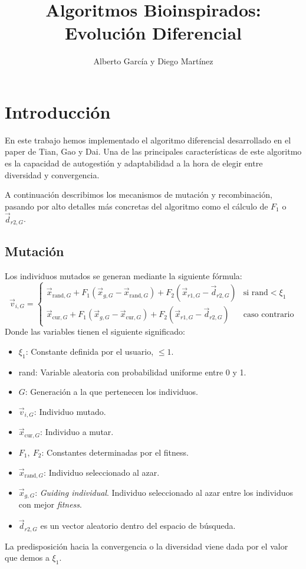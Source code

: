 \documentclass{article}
\title{Algoritmos Bioinspirados: Evolución Diferencial}
\author{Alberto García y Diego Martínez}
\begin{document}
\maketitle
\section{Introducción}
En este trabajo hemos implementado el algoritmo diferencial desarrollado en el paper de Tian, Gao y Dai\cite{mainPaper}. Una de las principales características de este algoritmo es la capacidad de autogestión y adaptabilidad a la hora de elegir entre diversidad y convergencia.

A continuación describimos los mecanismos de mutación y recombinación, pasando por alto detalles más concretas del algoritmo como el cálculo de $F_1$ o $\vec{d}_{r2, G}$.
\subsection{Mutación}
Los individuos mutados se generan mediante la siguiente fórmula:
\begin{equation}
    \vec{v}_{i,G} = \left\{\begin{array}{ll}
            \vec{x}_{\text{rand},G} + F_1(\vec{x}_{g,G}-\vec{x}_{\text{rand}, G})+ F_2(\vec{x}_{r1,G}-\vec{d}_{r2, G})&\text{si rand}<\xi_1\\
            \vec{x}_{\text{cur},G} + F_1(\vec{x}_{g,G}-\vec{x}_{\text{cur}, G})+ F_2(\vec{x}_{r1,G}-\vec{d}_{r2, G})&\text{caso contrario}
    \end{array}\right.
\label{ec_mutacion}
\end{equation}
Donde las variables tienen el siguiente significado:
\begin{itemize}
    \item $\xi_1$: Constante definida por el usuario, $\le1$.
    \item rand: Variable aleatoria con probabilidad uniforme entre 0 y 1.
    \item $G$: Generación a la que pertenecen los individuos.
    \item $\vec{v}_{i,G}$: Individuo mutado.
    \item $\vec{x}_{\text{cur},G}$: Individuo a mutar.
    \item $F_1,\ F_2$: Constantes determinadas por el fitness.
    \item $\vec{x}_{\text{rand},G}$: Individuo seleccionado al azar.
    \item $\vec{x}_{g,G}$: \textit{Guiding individual}. Individuo seleccionado al azar entre los individuos con mejor \textit{fitness}.
    \item $\vec{d}_{r2,G}$ es un vector aleatorio dentro del espacio de búsqueda.
\end{itemize}
La predisposición hacia la convergencia o la diversidad viene dada por el valor que demos a $\xi_1$.
\end{document}
